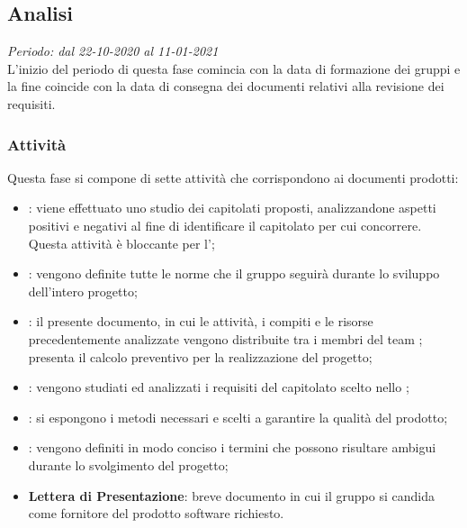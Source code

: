 \subsection{Analisi}
\textit{Periodo: dal 22-10-2020 al 11-01-2021}\\
L'inizio del periodo di questa fase comincia con la data di formazione dei gruppi e la fine coincide con la data di consegna dei documenti relativi alla revisione dei requisiti.
\subsubsection{Attività}
Questa fase si compone di sette attività che corrispondono ai documenti prodotti:
\begin{itemize}
\item \textbf{\SdF}: viene effettuato uno studio dei capitolati proposti, analizzandone aspetti positivi e negativi al fine di identificare il capitolato per cui concorrere. Questa attività è bloccante per l'\AdR ;
\item \textbf{\NdP}: vengono definite tutte le norme che il gruppo \Gruppo seguirà durante lo sviluppo dell'intero progetto;
\item \textbf{\PdP}: il presente documento, in cui le attività, i compiti\glo{} e le risorse precedentemente analizzate vengono distribuite tra i membri del team \Gruppo{}; presenta il calcolo preventivo per la realizzazione del progetto;
\item \textbf{\AdR}: vengono studiati ed analizzati i requisiti del capitolato\glo{} scelto nello \SdF;
\item \textbf{\PdQ}: si espongono i metodi necessari e scelti a garantire la qualità del prodotto;
\item \textbf{\Glossario}: vengono definiti in modo conciso i termini che possono risultare ambigui durante lo svolgimento del progetto;
\item \textbf{Lettera di Presentazione}: breve documento in cui il gruppo \Gruppo{} si candida come fornitore del prodotto software richiesto.
\end{itemize}
